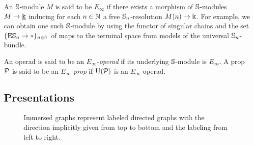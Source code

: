 An $\mathbb{S}$-module $M$ is said to be $E_\infty$ if there exists a morphism of $\mathbb{S}$-modules $M \to \underline{\Bbbk}$ inducing for each $n \in \mathbb{N}$ a free $\mathbb{S}_n$-resolution $M(n) \to \Bbbk$.
For example, we can obtain one such $\mathbb{S}$-module by using the functor of singular chains and the set $\{\mathrm{E} \mathbb{S}_n \to \ast\}_{n \in \mathbb{N}}$ of maps to the terminal space from models of the universal $\mathbb{S}_n$-bundle.

An operad is said to be an \textit{$E_\infty$-operad} if its underlying $\mathbb{S}$-module is $E_\infty$.
A prop $\mathcal{P}$ is said to be an \textit{$E_\infty$-prop} if $\operatorname{U}(\mathcal{P})$ is an $E_\infty$-operad.

\subsection{Presentations} \label{ss:presentation}

\begin{figure}
	
	\caption{Immersed graphs represent labeled directed graphs with the direction implicitly given from top to bottom and the labeling from left to right.}
	\label{f:immersion}
\end{figure}


